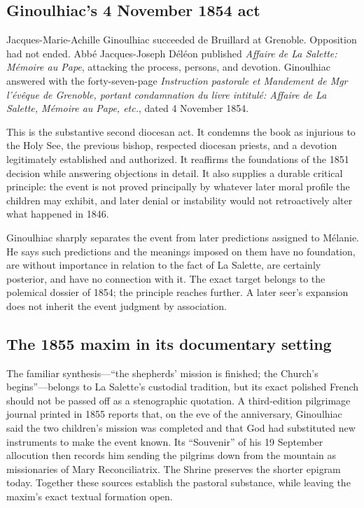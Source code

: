\subsection{Ginoulhiac's 4 November 1854 act}

Jacques-Marie-Achille Ginoulhiac succeeded de Bruillard at Grenoble. Opposition had not ended. Abbé Jacques-Joseph Déléon published \emph{Affaire de La Salette: Mémoire au Pape}, attacking the process, persons, and devotion. Ginoulhiac answered with the forty-seven-page \emph{Instruction pastorale et Mandement de Mgr l'évêque de Grenoble, portant condamnation du livre intitulé: Affaire de La Salette, Mémoire au Pape, etc.}, dated 4 November 1854.

This is the substantive second diocesan act. It condemns the book as injurious to the Holy See, the previous bishop, respected diocesan priests, and a devotion legitimately established and authorized. It reaffirms the foundations of the 1851 decision while answering objections in detail. It also supplies a durable critical principle: the event is not proved principally by whatever later moral profile the children may exhibit, and later denial or instability would not retroactively alter what happened in 1846.

Ginoulhiac sharply separates the event from later predictions assigned to Mélanie. He says such predictions and the meanings imposed on them have no foundation, are without importance in relation to the fact of La Salette, are certainly posterior, and have no connection with it. The exact target belongs to the polemical dossier of 1854; the principle reaches further. A later seer's expansion does not inherit the event judgment by association.


\subsection{The 1855 maxim in its documentary setting}

The familiar synthesis---``the shepherds' mission is finished; the Church's begins''---belongs to La Salette's custodial tradition, but its exact polished French should not be passed off as a stenographic quotation. A third-edition pilgrimage journal printed in 1855 reports that, on the eve of the anniversary, Ginoulhiac said the two children's mission was completed and that God had substituted new instruments to make the event known. Its ``Souvenir'' of his 19 September allocution then records him sending the pilgrims down from the mountain as missionaries of Mary Reconciliatrix. The Shrine preserves the shorter epigram today. Together these sources establish the pastoral substance, while leaving the maxim's exact textual formation open.

